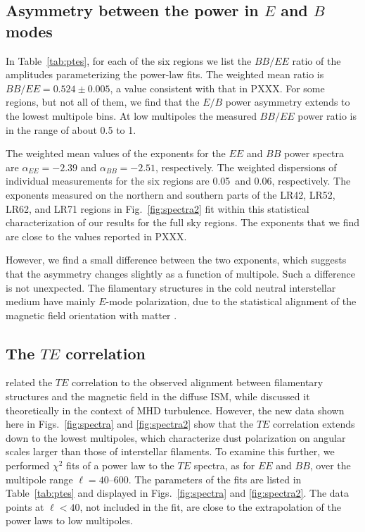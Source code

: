 \documentclass[longauth,traditabstract]{aa}
\newcommand{\mvalpee}{-2.39} %
\newcommand{\mvalpeed}{0.05} %
\newcommand{\mvalpbb}{-2.51} %
\newcommand{\mvalpbbd}{0.06} %
\begin{document}
 \subsection{Asymmetry between the power in $E$ and $B$ modes}
 \label{subsec:E_B_ratio}


In Table~\ref{tab:ptes}, for each of the six regions we list the $BB/EE$ ratio of the amplitudes parameterizing the power-law fits.
The weighted mean ratio is $BB/EE = 0.524\pm0.005$, a value consistent with that in PXXX.
For some regions, but not all of them, we find
that the $E/B$ power asymmetry extends to the lowest multipole bins. 
At low multipoles the measured $BB/EE$ power ratio is in the range of about 0.5 to 1. 

The weighted mean values of the exponents for the $EE$ and $BB$ power spectra 
are $\alpha_{EE} = \mvalpee$ and $\alpha_{BB} = \mvalpbb$, respectively. 
The weighted dispersions of individual measurements for the six regions are \mvalpeed\ and \mvalpbbd, respectively. 
The exponents measured on the northern and southern parts of the LR42, LR52, LR62, and LR71 regions in Fig.~\ref{fig:spectra2} fit within this statistical characterization of our results 
for the full sky regions.
The exponents that we find are close to the values reported in PXXX. 

However, we find a small difference between the two exponents, which
suggests that the asymmetry changes slightly as a function of multipole.
Such a difference is not unexpected. The filamentary structures in the cold neutral interstellar medium have mainly $E$-mode polarization, due to the 
statistical alignment of the magnetic field orientation with matter \citep{Clark13,planck2015-XXXVIII,Ghosh16}.


\subsection{ The $TE$ correlation}
\label{subsec:TE_correlation}

\citet{planck2015-XXXVIII} related the 
$TE$ correlation to the observed alignment between filamentary structures and the magnetic field in the diffuse ISM,
while \citet{Caldwell17} discussed it theoretically in the context of MHD turbulence.
However, the new data shown here in Figs.~\ref{fig:spectra} and \ref{fig:spectra2} show that the $TE$ correlation extends down to the lowest multipoles, which
characterize dust polarization on angular scales larger than those of interstellar filaments. 
To examine this further,
we performed $\chi^2$ fits of a power law to the $TE$ spectra, as for $EE$ and $BB$, over the multipole range $\ell=40$--600.
The parameters of the fits are listed in Table~\ref{tab:ptes} and displayed in Figs.~\ref{fig:spectra} and \ref{fig:spectra2}.
The data points at $\ell < 40$, not included in the fit, are close to the extrapolation of the power laws to low multipoles. 
\end{document}

